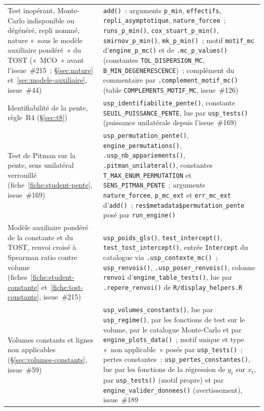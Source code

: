 \documentclass[a4paper,11pt]{article}
\newcommand{\code}[1]{\texttt{\small #1}}
\begin{document}
{\begin{longtable}{@{}p{5.6cm}p{9.4cm}@{}}
Test inopérant, Monte-Carlo indisponible ou dégénéré, repli nommé, nature «~sous le modèle
auxiliaire pondéré~» du TOST («~MCO~» avant l'issue~\#215~; §\ref{sec:nature} et~\ref{sec:modele-auxiliaire}, issue~\#44) & \code{add()}~: arguments \code{p\_min},
\code{effectifs}, \code{repli\_asymptotique}, \code{nature\_forcee}~; \code{runs\_p\_min()},
\code{cox\_stuart\_p\_min()}, \code{smirnov\_p\_min()}, \code{mk\_p\_min()}~; motif
\code{motif\_mc} d'\code{engine\_p\_mc()} et de \code{.mc\_p\_values()} (constantes
\code{TOL\_DISPERSION\_MC}, \code{B\_MIN\_DEGENERESCENCE})~; complément du commentaire par
\code{.complement\_motif\_mc()} (table \code{COMPLEMENTS\_MOTIF\_MC}, issue~\#126) \\
Identifiabilité de la pente, règle~R4 (§\ref{sec:t8}) & \code{usp\_identifiabilite\_pente()},
constante \code{SEUIL\_PUISSANCE\_PENTE}, lue par \code{usp\_tests()} (puissance unilatérale
depuis l'issue~\#169) \\
Test de Pitman sur la pente, sens unilatéral verrouillé (fiche~\ref{fiche:student-pente},
issue~\#169) & \code{usp\_permutation\_pente()}, \code{engine\_permutations()},
\code{.usp\_nb\_appariements()}, \code{.pitman\_unilateral()}, constantes
\code{T\_MAX\_ENUM\_PERMUTATION} et \code{SENS\_PITMAN\_PENTE}~; arguments \code{nature\_forcee},
\code{p\_mc\_ext} et \code{err\_mc\_ext} d'\code{add()}~; \code{res\$metadata\$permutation\_pente}
posé par \code{run\_engine()} \\
Modèle auxiliaire pondéré de la constante et du TOST, renvoi croisé à Spearman ratio contre
volume (fiches~\ref{fiche:student-constante} et~\ref{fiche:tost-constante}, issue~\#215) &
\code{usp\_poids\_gls()}, \code{test\_intercept()}, \code{test\_tost\_intercept()}, entrée
\code{Intercept} du catalogue via \code{.usp\_contexte\_mc()}~; \code{usp\_renvois()},
\code{.usp\_poser\_renvois()}, colonne \code{renvoi} d'\code{engine\_table\_tests()}, lue par
\code{.repere\_renvoi()} de \code{R/display\_helpers.R} \\
Volumes constants et lignes non applicables (§\ref{sec:volumes-constants}, issue~\#59) &
\code{usp\_volumes\_constants()}, lue par \code{usp\_regime()}, par les fonctions de test sur le
volume, par le catalogue Monte-Carlo et par \code{engine\_plots\_data()}~; motif unique et
type «~non applicable~» posés par \code{usp\_tests()}~; pertes constantes~:
\code{usp\_pertes\_constantes()}, lue par les fonctions de la régression de $y_t$ sur $x_t$, par
\code{usp\_tests()} (motif propre) et par \code{engine\_valider\_donnees()} (avertissement),
issue~\#189 \\

\end{longtable}}
\end{document}
